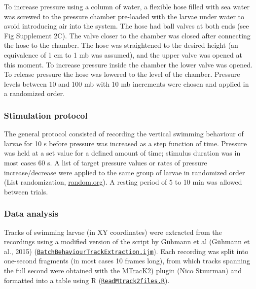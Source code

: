 \documentclass[
  11pt,
]{article}
\begin{document}
To increase pressure using a column of water, a flexible hose filled
with sea water was screwed to the pressure chamber pre-loaded with the
larvae under water to avoid introducing air into the system. The hose
had ball valves at both ends (see Fig Supplement 2C). The valve closer
to the chamber was closed after connecting the hose to the chamber. The
hose was straightened to the desired height (an equivalence of 1 cm to 1
mb was assumed), and the upper valve was opened at this moment. To
increase pressure inside the chamber the lower valve was opened. To
release pressure the hose was lowered to the level of the chamber.
Pressure levels between 10 and 100 mb with 10 mb increments were chosen
and applied in a randomized order.

\subsubsection{Stimulation protocol}\label{stimulation-protocol}

The general protocol consisted of recording the vertical swimming
behaviour of larvae for 10 s before pressure was increased as a step
function of time. Pressure was held at a set value for a defined amount
of time; stimulus duration was in most cases 60 s. A list of target
pressure values or rates of pressure increase/decrease were applied to
the same group of larvae in randomized order (List randomization,
\url{random.org}). A resting period of 5 to 10 min was allowed between
trials.

\subsubsection{Data analysis}\label{data-analysis}

Tracks of swimming larvae (in XY coordinates) were extracted from the
recordings using a modified version of the script by Gühmann et al
(Gühmann et al., 2015)
(\href{https://github.com/JekelyLab/Bezares_et_al_2023_Pressure/blob/main/Code/BatchBehaviour/BatchBehaviourTrackExtraction.ijm}{\texttt{BatchBehaviourTrackExtraction.ijm}}).
Each recording was split into one-second fragments (in most cases 10
frames long), from which tracks spanning the full second were obtained
with the
\href{https://valelab4.ucsf.edu/~nstuurman/IJplugins/MTrack2.html}{MTracK2})
plugin (Nico Stuurman) and formatted into a table using R
(\href{https://github.com/JekelyLab/Bezares_et_al_2023_Pressure/blob/main/Code/BatchBehaviour/ReadMtrack2files.R}{\texttt{ReadMtrack2files.R}}).
\end{document}
